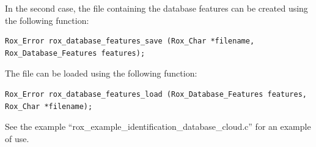 In the second case, the file containing the database features can be
created using the following function:
\begin{lstlisting}
Rox_Error rox_database_features_save (Rox_Char *filename, Rox_Database_Features features);
\end{lstlisting}
The file can be loaded using the following function:
\begin{lstlisting}
Rox_Error rox_database_features_load (Rox_Database_Features features, Rox_Char *filename);
\end{lstlisting}

See the example ``rox\_example\_identification\_database\_cloud.c'' for an example of use.
